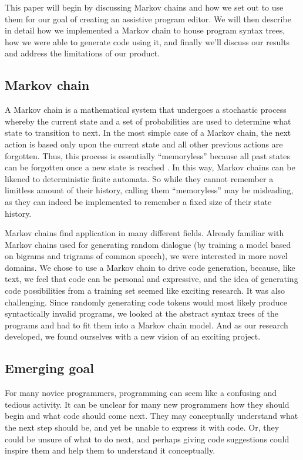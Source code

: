 \documentclass[titlepage]{article}
\begin{document}
This paper will begin by discussing Markov chains and how we set out to use them for our goal of creating an assistive program editor. We will then describe in detail how we implemented a Markov chain to house program syntax trees, how we were able to generate code using it, and finally we'll discuss our results and address the limitations of our product.

\subsection{Markov chain}

A Markov chain is a mathematical system that undergoes a stochastic process whereby
the current state and a set of probabilities are used to determine what state
to transition to next. In the most simple case of a Markov chain, the next action is based
only upon the current state and all other previous actions are forgotten.
Thus, this process is essentially ``memoryless'' because all past states can be
forgotten once a new state is reached \cite{markov}. In this way, Markov chains can be likened
to deterministic finite automata. So while they cannot remember a limitless amount of their history,
calling them ``memoryless'' may be misleading, as they can indeed be implemented to remember a fixed
size of their state history.

Markov chains find application in many different fields. Already familiar with Markov chains used for generating random dialogue (by training a model based on bigrams and trigrams of common speech), we were interested in more novel domains. We chose to use a Markov chain to drive code generation, because, like text, we feel that code can be personal and expressive, and the idea of generating code possibilities from a training set seemed like exciting research. It was also challenging. Since randomly generating code tokens would most likely produce syntactically invalid programs, we looked at the abstract syntax trees of the programs and had to fit them into a Markov chain model. And as our research developed, we found ourselves with a new vision of an exciting project.

\subsection{Emerging goal}

For many novice programmers, programming can seem like a confusing and
tedious activity. It can be unclear for many new programmers how they should
begin and what code should come next. They may conceptually understand
what the next step should be, and yet be unable to express it with code. Or, they
could be unsure of what to do next, and perhaps giving code suggestions could inspire them
and help them to understand it conceptually.
\end{document}
